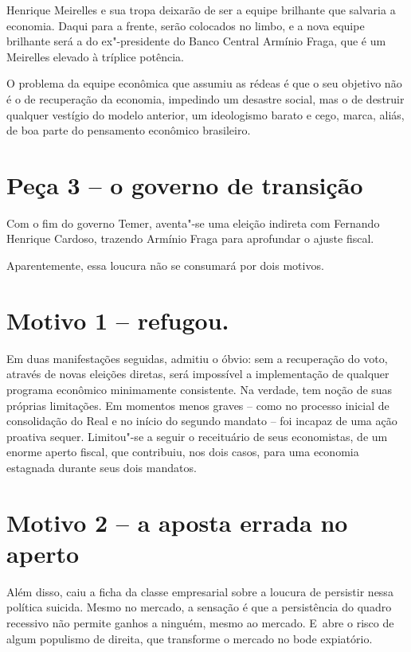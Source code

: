 Henrique Meirelles e sua tropa deixarão de ser a equipe brilhante que
salvaria a economia. Daqui para a frente, serão colocados no limbo, e a
nova equipe brilhante será a do ex"-presidente do Banco Central Armínio
Fraga, que é um Meirelles elevado à tríplice potência.

O problema da equipe econômica que assumiu as rédeas é que o seu
objetivo não é o de recuperação da economia, impedindo um desastre
social, mas o de destruir qualquer vestígio do modelo anterior, um
ideologismo barato e cego, marca, aliás, de boa parte do pensamento
econômico brasileiro.

\section{Peça 3 -- o governo de transição}

Com o fim do governo Temer, aventa"-se uma eleição indireta com Fernando
Henrique Cardoso, trazendo Armínio Fraga para aprofundar o ajuste
fiscal.

Aparentemente, essa loucura não se consumará por dois motivos.

\section{Motivo 1 --  refugou.}

Em duas manifestações seguidas,  admitiu o óbvio: sem a recuperação
do voto, através de novas eleições diretas, será impossível a
implementação de qualquer programa econômico minimamente consistente. Na
verdade,  tem noção de suas próprias limitações. Em momentos menos
graves -- como no processo inicial de consolidação do Real e no início
do segundo mandato --  foi incapaz de uma ação proativa sequer.
Limitou"-se a seguir o receituário de seus economistas, de um enorme
aperto fiscal, que contribuiu, nos dois casos, para uma economia
estagnada durante seus dois mandatos.

\section{Motivo 2 -- a aposta errada no aperto}

Além disso, caiu a ficha da classe empresarial sobre a loucura de
persistir nessa política suicida. Mesmo no mercado, a sensação é que a
persistência do quadro recessivo não permite ganhos a ninguém, mesmo ao
mercado. E~abre o risco de algum populismo de direita, que transforme o
mercado no bode expiatório.


